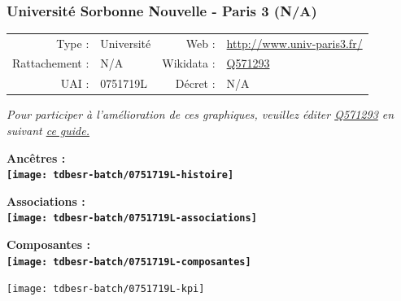 \documentclass[12pt,french,]{article}
\begin{document}
\ifoddpage \fi ~\newpage  

\hypertarget{universituxe9-sorbonne-nouvelle---paris-3-na}{%
\subsubsection{Université Sorbonne Nouvelle - Paris 3
(N/A)}\label{universituxe9-sorbonne-nouvelle---paris-3-na}}

\begin{tabular*}{\textwidth}{rp{5cm}rl}  
\hline  
Type : & Université & Web : &\href{http://www.univ-paris3.fr/}{http://www.univ-paris3.fr/} \\  
Rattachement : & N/A & Wikidata : & \href{https://www.wikidata.org/entity/Q571293}{Q571293} \\  
UAI : & 0751719L & Décret : & N/A \\  
\hline  
\end{tabular*}

\textit{\scriptsize Pour participer à l'amélioration de ces graphiques, veuillez éditer  \href{https://www.wikidata.org/entity/Q571293}{Q571293}  en suivant \href{https://github.com/cpesr/wikidataESR/blob/master/Rmd/wikidataESR.md}{ce guide.}}

\vspace{1cm}  
\begin{minipage}[b]{0.50\textwidth}\begin{center} \bf Ancêtres : \\  
\texttt{[image: tdbesr-batch/0751719L-histoire]} \end{center}\end{minipage}\begin{minipage}[b]{0.50\textwidth}\begin{center} \bf Associations : \\  
\texttt{[image: tdbesr-batch/0751719L-associations]} \end{center}\end{minipage}

\hrulefill

\begin{center} \bf Composantes : \\  
\texttt{[image: tdbesr-batch/0751719L-composantes]} \end{center}

\begin{center}\texttt{[image: tdbesr-batch/0751719L-kpi]} \end{center}\checkoddpage

\ifoddpage \fi ~\newpage  
\end{document}
